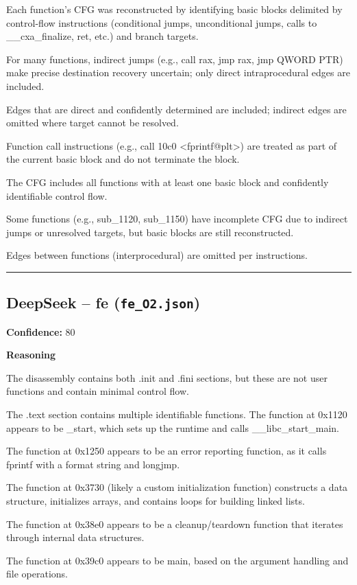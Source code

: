 Each function's CFG was reconstructed by identifying basic blocks delimited by control-flow instructions (conditional jumps, unconditional jumps, calls to \_\_cxa\_finalize, ret, etc.) and branch targets.

For many functions, indirect jumps (e.g., call rax, jmp rax, jmp QWORD PTR) make precise destination recovery uncertain; only direct intraprocedural edges are included.

Edges that are direct and confidently determined are included; indirect edges are omitted where target cannot be resolved.

Function call instructions (e.g., call 10c0 <fprintf@plt>) are treated as part of the current basic block and do not terminate the block.

The CFG includes all functions with at least one basic block and confidently identifiable control flow.

Some functions (e.g., sub\_1120, sub\_1150) have incomplete CFG due to indirect jumps or unresolved targets, but basic blocks are still reconstructed.

Edges between functions (interprocedural) are omitted per instructions.

\bigskip
\hrule
\bigskip

\subsection{DeepSeek -- fe (\texttt{fe\_O2.json})}

\textbf{Confidence:} 80

\textbf{Reasoning}

The disassembly contains both .init and .fini sections, but these are not user functions and contain minimal control flow.

The .text section contains multiple identifiable functions. The function at 0x1120 appears to be \_start, which sets up the runtime and calls \_\_libc\_start\_main.

The function at 0x1250 appears to be an error reporting function, as it calls fprintf with a format string and longjmp.

The function at 0x3730 (likely a custom initialization function) constructs a data structure, initializes arrays, and contains loops for building linked lists.

The function at 0x38e0 appears to be a cleanup/teardown function that iterates through internal data structures.

The function at 0x39c0 appears to be main, based on the argument handling and file operations.

